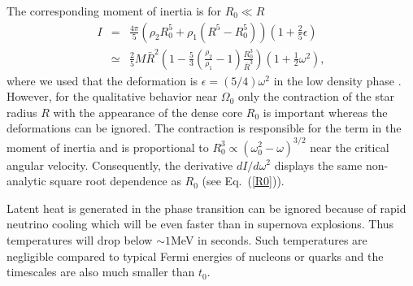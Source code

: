 \begin{multicols}{2}
The corresponding moment of inertia is for $R_0\ll R$  
\begin{eqnarray}
   I &=& \frac{4\pi}{5} \left( \rho_2R_0^5+\rho_1(R^5-R_0^5)\right)
     (1+\frac{2}{5}\epsilon) \nonumber \\
     &\simeq& \frac{2}{5}M\bar{R}^2 
    \left( 1-\frac{5}{3}(\frac{\rho_2}{\rho_1}-1)\frac{R_0^3}{\bar{R}^3}\right)
      (1+\frac{1}{2}\omega^2),
    \label{I}
\end{eqnarray}
where we used that the deformation is $\epsilon=(5/4)\omega^2$ in the low
density phase \cite{Tassoul}. 
However, for the qualitative behavior near $\Omega_0$ only the contraction
of the star radius $R$ with the appearance of the dense core $R_0$
is important whereas the deformations can be ignored.
The contraction is responsible for the term in
the moment of inertia and is proportional to
$R_0^3\propto (\omega_0^2-\omega)^{3/2}$ near the critical angular
velocity. Consequently,  the derivative $dI/d\omega^2$ displays the same
non-analytic square root dependence as $R_0$ (see Eq.\ (\ref{R0})). 

Latent heat is generated in the phase transition can be ignored
because of rapid neutrino cooling which will be even
faster than in supernova explosions. Thus temperatures will
drop below $\sim 1$MeV in seconds. Such temperatures are negligible
compared to typical Fermi energies of nucleons or quarks and the
timescales are also much smaller than $t_0$.


\end{multicols}
